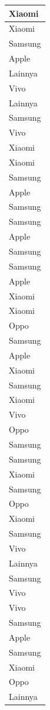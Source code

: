 \documentclass[
  letterpaper,
  DIV=11,
  numbers=noendperiod]{scrartcl}
\begin{document}
\begin{table}
\begin{tabular}[t]{l}
\hline
Xiaomi\\
\hline
Xiaomi\\
\hline
Samsung\\
\hline
Apple\\
\hline
Lainnya\\
\hline
Vivo\\
\hline
Lainnya\\
\hline
Samsung\\
\hline
Vivo\\
\hline
Xiaomi\\
\hline
Xiaomi\\
\hline
Samsung\\
\hline
Apple\\
\hline
Samsung\\
\hline
Samsung\\
\hline
Apple\\
\hline
Samsung\\
\hline
Samsung\\
\hline
Apple\\
\hline
Xiaomi\\
\hline
Xiaomi\\
\hline
Oppo\\
\hline
Samsung\\
\hline
Apple\\
\hline
Xiaomi\\
\hline
Samsung\\
\hline
Xiaomi\\
\hline
Vivo\\
\hline
Oppo\\
\hline
Samsung\\
\hline
Samsung\\
\hline
Xiaomi\\
\hline
Samsung\\
\hline
Oppo\\
\hline
Xiaomi\\
\hline
Samsung\\
\hline
Vivo\\
\hline
Lainnya\\
\hline
Samsung\\
\hline
Vivo\\
\hline
Vivo\\
\hline
Samsung\\
\hline
Apple\\
\hline
Samsung\\
\hline
Xiaomi\\
\hline
Oppo\\
\hline
Lainnya\\

\end{tabular}
\end{table}
\end{document}
